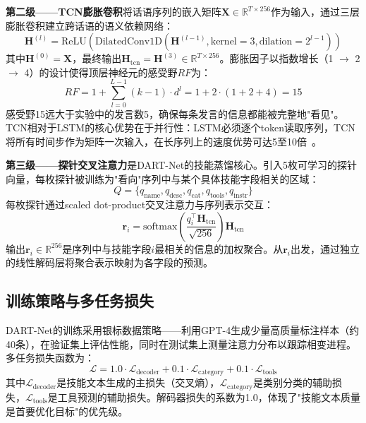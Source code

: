 \documentclass[12pt,a4paper]{ctexart}
\begin{document}
\textbf{第二级——TCN膨胀卷积}将话语序列的嵌入矩阵$\mathbf{X} \in \mathbb{R}^{T \times 256}$作为输入，通过三层膨胀卷积建立跨话语的语义依赖网络：
\begin{equation}
\mathbf{H}^{(l)} = \text{ReLU}(\text{DilatedConv1D}(\mathbf{H}^{(l-1)}, \text{kernel}=3, \text{dilation}=2^{l-1}))
\label{eq:tcn_layer}
\end{equation}
其中$\mathbf{H}^{(0)} = \mathbf{X}$，最终输出$\mathbf{H}_{\text{tcn}} = \mathbf{H}^{(3)} \in \mathbb{R}^{T \times 256}$。膨胀因子以指数增长（1 $\to$ 2 $\to$ 4）的设计使得顶层神经元的感受野$RF$为：
\begin{equation}
RF = 1 + \sum_{l=0}^{L-1} (k - 1) \cdot d^l = 1 + 2 \cdot (1 + 2 + 4) = 15
\label{eq:rf}
\end{equation}
感受野15远大于实验中的发言数5，确保每条发言的信息都能被完整地"看见"。TCN相对于LSTM的核心优势在于并行性：LSTM必须逐个token读取序列，TCN将所有时间步作为矩阵一次输入，在长序列上的速度优势可达5至10倍~\cite{bai2018tcn}。

\textbf{第三级——探针交叉注意力}是DART-Net的技能蒸馏核心。引入5枚可学习的探针向量，每枚探针被训练为"看向"序列中与某个具体技能字段相关的区域：
\begin{equation}
Q = \{q_{\text{name}}, q_{\text{desc}}, q_{\text{cat}}, q_{\text{tools}}, q_{\text{instr}}\}
\label{eq:probes}
\end{equation}
每枚探针通过scaled dot-product交叉注意力与序列表示交互：
\begin{equation}
\mathbf{r}_i = \text{softmax}\left(\frac{q_i^\top \mathbf{H}_{\text{tcn}}}{\sqrt{256}}\right) \mathbf{H}_{\text{tcn}}
\label{eq:cross_attn}
\end{equation}
输出$\mathbf{r}_i \in \mathbb{R}^{256}$是序列中与技能字段$i$最相关的信息的加权聚合。从$\mathbf{r}_i$出发，通过独立的线性解码层将聚合表示映射为各字段的预测。

\subsection{训练策略与多任务损失}

DART-Net的训练采用银标数据策略——利用GPT-4生成少量高质量标注样本（约40条），在验证集上评估性能，同时在测试集上测量注意力分布以跟踪相变进程。多任务损失函数为：
\begin{equation}
\mathcal{L} = 1.0 \cdot \mathcal{L}_{\text{decoder}} + 0.1 \cdot \mathcal{L}_{\text{category}} + 0.1 \cdot \mathcal{L}_{\text{tools}}
\label{eq:loss}
\end{equation}
其中$\mathcal{L}_{\text{decoder}}$是技能文本生成的主损失（交叉熵），$\mathcal{L}_{\text{category}}$是类别分类的辅助损失，$\mathcal{L}_{\text{tools}}$是工具预测的辅助损失。解码器损失的系数为1.0，体现了"技能文本质量是首要优化目标"的优先级。
\end{document}
